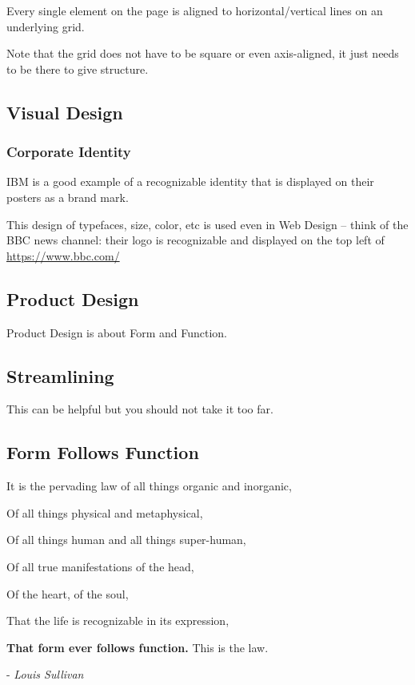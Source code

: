 Every single element on the page is aligned to horizontal/vertical lines on an underlying grid.

Note that the grid does not have to be square or even axis-aligned, it just needs to be there to give structure.

\subsection{Visual Design}
\subsubsection{Corporate Identity}
IBM is a good example of a recognizable identity that is displayed on their posters as a brand mark.

This design of typefaces, size, color, etc is used even in Web Design -- think of the BBC news channel: their logo is recognizable and displayed on the top left of \href{https://www.bbc.com/}{https://www.bbc.com/}

\subsection{Product Design}
Product Design is about Form and Function.

\subsection{Streamlining}
This can be helpful but you should not take it too far.

\subsection{Form Follows Function}
\begin{shaded}
It is the pervading law of all things organic and inorganic,

Of all things physical and metaphysical,

Of all things human and all things super-human,

Of all true manifestations of the head,

Of the heart, of the soul,

That the life is recognizable in its expression,

\textbf{That form ever follows function.} This is the law.

- \textit{Louis Sullivan}
\end{shaded}

